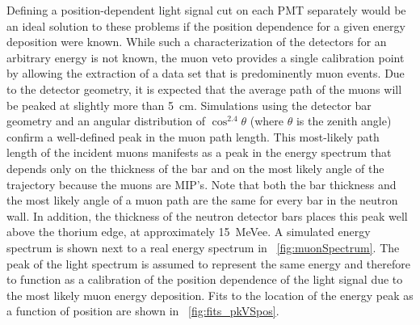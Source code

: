 Defining a position-dependent light signal cut on each PMT separately would be an ideal solution to these problems if the position dependence for a given energy deposition were known.  While such a characterization of the detectors for an arbitrary energy is not known, the muon veto provides a single calibration point by allowing the extraction of a data set that is predominently muon events.  Due to the detector geometry, it is expected that the average path of the muons will be peaked at slightly more than 5~cm.  Simulations using the detector bar geometry and an angular distribution of $\cos^{2.4}{\theta}$ \citep{cosmicsZenithDependence} (where $\theta$ is the zenith angle) confirm a well-defined peak in the muon path length. This most-likely path length of the incident muons manifests as a peak in the energy spectrum that depends only on the thickness of the bar and on the most likely angle of the trajectory because the muons are MIP's.  Note that both the bar thickness and the most likely angle of a muon path are the same for every bar in the neutron wall.  In addition, the thickness of the neutron detector bars places this peak well above the thorium edge, at approximately 15~MeVee.  A simulated energy spectrum is shown next to a real energy spectrum in {\fig}~\ref{fig:muonSpectrum}.  The peak of the light spectrum is assumed to represent the same energy and therefore to function as a calibration of the position dependence of the light signal due to the most likely muon energy deposition.  Fits to the location of the energy peak as a function of position are shown in {\fig}~\ref{fig:fits_pkVSpos}.
